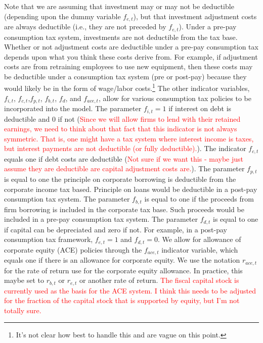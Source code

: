 \noindent\noindent Note that we are assuming that investment may or may not be deductible (depending upon the dummy variable $f_{e,t}$), but that investment adjustment costs are always deductible (i.e., they are not preceded by $f_{e,t}$).  Under a pre-pay consumption tax system, investments are not deductible from the tax base.  Whether or not adjustment costs are deductible under a pre-pay consumption tax depends upon what you think these costs derive from.  For example, if adjustment costs are from retraining employees to use new equipment, then these costs may be deductible under a consumption tax system (pre or post-pay) because they would likely be in the form of wage/labor costs.\footnote{It's not clear how best to handle this and \citet{DZ2013} are vague on this point.}  The other indicator variables, $f_{i,t}$, $f_{c,t}$,$f_{p,t}$, $f_{b,t}$, $f_{d}$, and $f_{ace,t}$, allow for various consumption tax policies to be incorporated into the model.  The parameter $f_{i,t}=1$ if interest on debt is deductible and 0 if not (\textcolor{red}{Since we will allow firms to lend with their retained earnings, we need to think about that fact that this indicator is not always symmetric.  That is, one might have a tax system where interest income is taxes, but interest payments are not deductible (or fully deductible).}).  The indicator $f_{c,t}$ equals one if debt costs are deductible (\textcolor{red}{Not sure if we want this - maybe just assume they are deductible are capital adjustment costs are.}).  The parameter $f_{p,t}$ is equal to one the principle on corporate borrowing is deductible from the corporate income tax based.  Principle on loans would be deductible in a post-pay consumption tax system.  The parameter $f_{b,t}$ is equal to one if the proceeds from firm borrowing is included in the corporate tax base.  Such proceeds would be included in a pre-pay consumption tax system.  The parameter $f_{d,t}$ is equal to one if capital can be depreciated and zero if not.  For example, in a post-pay consumption tax framework, $f_{e,t}=1$ and $f_{d,t}=0$. We allow for allowance of corporate equity (ACE) policies through the $f_{ace,t}$ indicator variable, which equals one if there is an allowance for corporate equity.  We use the notation $r_{ace,t}$ for the rate of return use for the corporate equity allowance.  In practice, this maybe set to $r_{b,t}$ or $r_{e,t}$ or another rate of return. \textcolor{red}{The fiscal capital stock is currently used as the basis for the ACE system.  I think this needs to be adjusted for the fraction of the capital stock that is supported by equity, but I'm not totally sure.}

